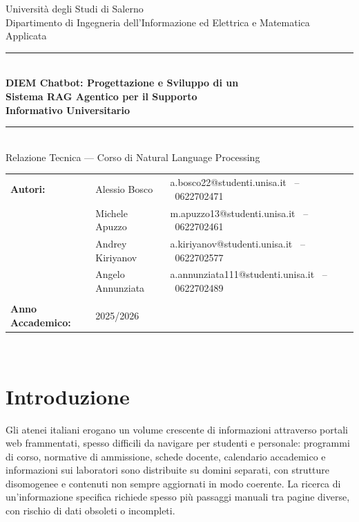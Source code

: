 \documentclass[11pt,a4paper]{article}
\begin{document}
\begin{titlepage}
  \centering
  \vspace*{2cm}
  {\Large Università degli Studi di Salerno\\[4pt]
   \normalsize Dipartimento di Ingegneria dell'Informazione ed Elettrica e Matematica Applicata}\\[1cm]
  \rule{\textwidth}{1pt}\\[0.5cm]
  {\LARGE\bfseries\color{blue!70!black}
    DIEM Chatbot: Progettazione e Sviluppo di un\\[6pt]
    Sistema RAG Agentico per il Supporto\\[6pt]
    Informativo Universitario
  }\\[0.4cm]
  \rule{\textwidth}{1pt}\\[1.5cm]
  {\large Relazione Tecnica --- Corso di Natural Language Processing}\\[2cm]
  \begin{tabular}{lll}
    \textbf{Autori:} & Alessio Bosco    & \small a.bosco22@studenti.unisa.it \ -- \ 0622702471 \\[3pt]
                     & Michele Apuzzo   & \small m.apuzzo13@studenti.unisa.it \ -- \ 0622702461 \\[3pt]
                     & Andrey Kiriyanov & \small a.kiriyanov@studenti.unisa.it \ -- \ 0622702577 \\[3pt]
                      & Angelo Annunziata & \small a.annunziata111@studenti.unisa.it \ -- \ 0622702489 \\\\[6pt]
    \textbf{Anno Accademico:} & 2025/2026 & \\[4pt]
  \end{tabular}\\[3cm]
\end{titlepage}

\tableofcontents

\newpage
\section{Introduzione}
\label{sec:intro}

Gli atenei italiani erogano un volume crescente di informazioni attraverso portali web
frammentati, spesso difficili da navigare per studenti e personale: programmi di corso,
normative di ammissione, schede docente, calendario accademico e informazioni sui
laboratori sono distribuite su domini separati, con strutture disomogenee e contenuti
non sempre aggiornati in modo coerente. La ricerca di un'informazione specifica richiede
spesso più passaggi manuali tra pagine diverse, con rischio di dati obsoleti o
incompleti.
\end{document}
